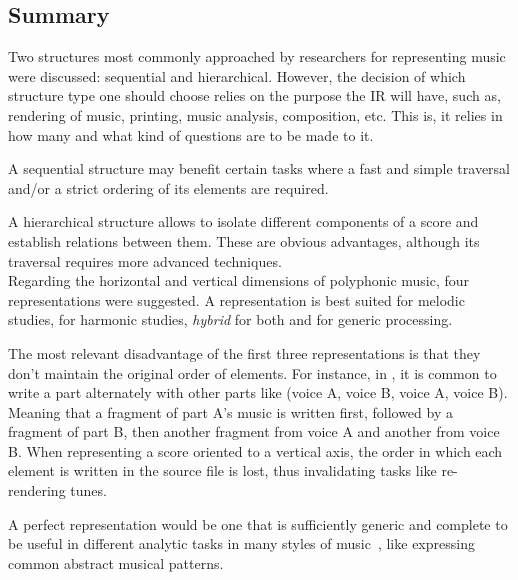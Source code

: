 \subsection{Summary}

Two structures most commonly approached by researchers for representing music were discussed:
sequential and hierarchical. However, the decision of which structure type one should choose relies
on the purpose the \ac{IR} will have, such as, rendering of music, printing, music analysis,
composition, etc. This is, it relies in how many and what kind of questions are to be made to it.

A sequential structure may benefit certain tasks where a fast and simple traversal and/or a strict
ordering of its elements are required.

A hierarchical structure allows to isolate different components of a score and establish relations
between them. These are obvious advantages, although its traversal requires more advanced
techniques.\\

Regarding the horizontal and vertical dimensions of polyphonic music, four representations were
suggested. A \partwise{} representation is best suited for melodic studies, \timewise{} for harmonic
studies, \emph{hybrid} for both and \sourcewise{} for generic processing.

The most relevant disadvantage of the first three representations is that they don't maintain the
original order of elements. For instance, in \abc{}, it is common to write a part alternately with
other parts like (voice A, voice B, voice A, voice B). Meaning that a fragment of part A's music is
written first, followed by a fragment of part B, then another fragment from voice A and another from
voice B. When representing a score oriented to a vertical axis, the order in which each element is
written in the source file is lost, thus invalidating tasks like re-rendering \abc{} tunes.



A perfect representation would be one that is sufficiently generic and complete to be useful
in different analytic tasks in many styles of music~\cite{Honing1993}, like expressing common
abstract musical patterns.
